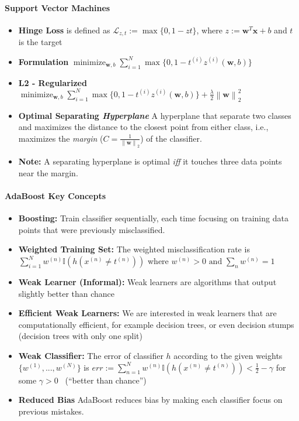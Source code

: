 \documentclass[10pt]{article}
\newcommand{\norm}[1]{\left\lVert#1\right\rVert}
\newcommand{\bw}{\mathbf{w}}
\newcommand{\bx}{\mathbf{x}}
\begin{document}
\paragraph{Support Vector Machines}
\begin{itemize}
    \setlength\itemsep{-0.45em}
    \item \textbf{Hinge Loss} is defined as $\mathcal{L}_{z, t}:= \max \{0, 1- zt\}$, where $z:= \bw^T \bx + b$ and $t$ is the target
    \item \textbf{Formulation} $\operatorname{minimize}_{\bw, b} \sum_{i =1}^N\max\{0, 1 - t^{(i)}z^{(i)}(\bw, b)\}$ 
    \item \textbf{L2 - Regularized} $\operatorname{minimize}_{\bw, b} \sum_{i =1}^N\max\{0, 1 - t^{(i)}z^{(i)}(\bw, b)\} + \frac{\lambda}{2} \norm{\bw}^2_2$
    \item \textbf{Optimal Separating \textit{Hyperplane}} A hyperplane that separate two classes and maximizes the distance to the closest point from either class, i.e., maximizes the \textit{margin} ($C = \frac{1}{\norm{\bw}_2}$) of the classifier. 
    \item \textbf{Note:} A separating hyperplane is optimal \textit{iff} it touches three data points near the margin. 
\end{itemize}

\paragraph{AdaBoost Key Concepts}
\begin{itemize}
    \setlength\itemsep{-0.45em}
    \item \textbf{Boosting:} Train classifier sequentially, each time focusing on training data points that were previously misclassified. 
    \item \textbf{Weighted Training Set:} The weighted misclassification rate is $\sum_{i = 1}^N w^{(n)} \mathbb{I}(h(x^{(n)} \neq t^{(n)}))$ where $w^{(n)} > 0 \text{ and } \sum_n w^{(n)} = 1$
    \item \textbf{Weak Learner (Informal):} Weak learners are algorithms that output slightly better than chance
    \item \textbf{Efficient Weak Learners:} We are interested in weak learners that are computationally efficient, for example decision trees, or even decision stumps (decision trees with only one split) 
    \item \textbf{Weak Classifier:} The error of classifier $h$ according to the given weights $\{w^{(1)},...,w^{(N)}\}$ is $err:= \sum_{n = 1}^N w^{(n)} \mathbb{I}(h(x^{(n)} \neq t^{(n)})) < \frac{1}{2} - \gamma$ for some $\gamma >0$ ~(``better than chance'')
    \item \textbf{Reduced Bias} AdaBoost reduces bias by making each classifier focus on previous mistakes. 
\end{itemize}
\end{document}
